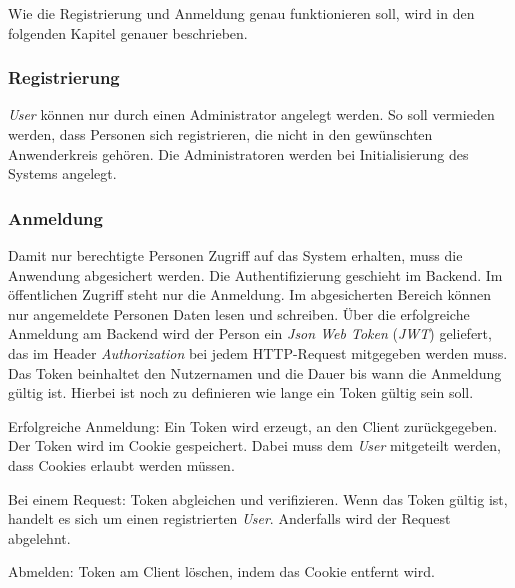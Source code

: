 Wie die Registrierung und Anmeldung genau funktionieren soll, wird in den folgenden Kapitel genauer beschrieben.

\subsubsection{Registrierung}

\textit{User} können nur durch einen Administrator angelegt werden. So soll vermieden werden, dass Personen sich registrieren, die nicht in den gewünschten Anwenderkreis gehören. Die Administratoren werden bei Initialisierung des Systems angelegt.

\subsubsection{Anmeldung}

Damit nur berechtigte Personen Zugriff auf das System erhalten, muss die Anwendung abgesichert werden. Die Authentifizierung geschieht im Backend. Im öffentlichen Zugriff steht nur die Anmeldung. Im abgesicherten Bereich können nur angemeldete Personen Daten lesen und schreiben. Über die erfolgreiche Anmeldung am Backend wird der Person ein \textit{Json Web Token} (\textit{JWT}) geliefert, das im Header \textit{Authorization} bei jedem HTTP-Request mitgegeben werden muss. Das Token beinhaltet den Nutzernamen und die Dauer bis wann die Anmeldung gültig ist. Hierbei ist noch zu definieren wie lange ein Token gültig sein soll.

Erfolgreiche Anmeldung: Ein Token wird erzeugt, an den Client zurückgegeben. Der Token wird im Cookie gespeichert. Dabei muss dem \textit{User} mitgeteilt werden, dass Cookies erlaubt werden müssen.

Bei einem Request: Token abgleichen und verifizieren. Wenn das Token gültig ist, handelt es sich um einen registrierten \textit{User}. Anderfalls wird der Request abgelehnt.

Abmelden: Token am Client löschen, indem das Cookie entfernt wird.

